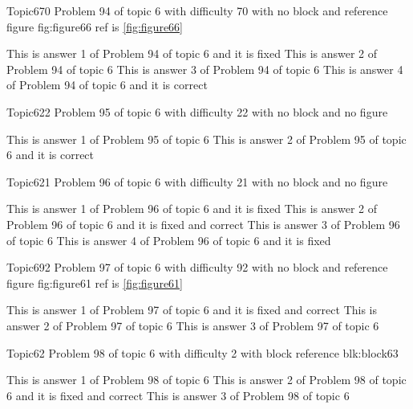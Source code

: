 \documentclass[master]{exam}
\begin{document}
\begin{problem}{Topic6}{70}
	Problem 94 of topic 6 with difficulty 70 with no block and reference figure fig:figure66 ref is \ref{fig:figure66}
	\begin{answers}
		\answer[fixed] This is answer 1 of Problem 94 of topic 6 and it is fixed
		\answer This is answer 2 of Problem 94 of topic 6 
		\answer This is answer 3 of Problem 94 of topic 6 
		\answer[correct] This is answer 4 of Problem 94 of topic 6 and it is correct
	\end{answers}
\end{problem}

\begin{problem}{Topic6}{22}
	Problem 95 of topic 6 with difficulty 22 with no block and no figure
	\begin{answers}
		\answer This is answer 1 of Problem 95 of topic 6 
		\answer[correct] This is answer 2 of Problem 95 of topic 6 and it is correct
	\end{answers}
\end{problem}

\begin{problem}{Topic6}{21}
	Problem 96 of topic 6 with difficulty 21 with no block and no figure
	\begin{answers}
		\answer[fixed] This is answer 1 of Problem 96 of topic 6 and it is fixed
		 This is answer 2 of Problem 96 of topic 6 and it is fixed and correct
		\answer This is answer 3 of Problem 96 of topic 6 
		\answer[fixed] This is answer 4 of Problem 96 of topic 6 and it is fixed
	\end{answers}
\end{problem}

\begin{problem}{Topic6}{92}
	Problem 97 of topic 6 with difficulty 92 with no block and reference figure fig:figure61 ref is \ref{fig:figure61}
	\begin{answers}
		 This is answer 1 of Problem 97 of topic 6 and it is fixed and correct
		\answer This is answer 2 of Problem 97 of topic 6 
		\answer This is answer 3 of Problem 97 of topic 6 
	\end{answers}
\end{problem}

\begin{problem}[requires=blk:block63]{Topic6}{2}
	Problem 98 of topic 6 with difficulty 2 with block reference blk:block63
	\begin{answers}
		\answer This is answer 1 of Problem 98 of topic 6 
		 This is answer 2 of Problem 98 of topic 6 and it is fixed and correct
		\answer This is answer 3 of Problem 98 of topic 6 
	\end{answers}
\end{problem}
\end{document}
